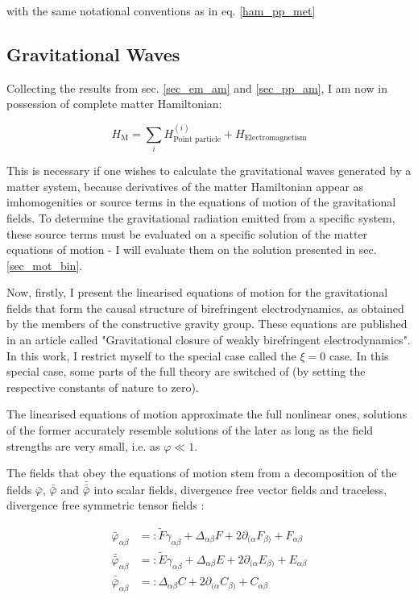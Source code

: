 \documentclass[11pt]{article}
\begin{document}
with the same notational conventions as in eq. \ref{ham_pp_met}

\subsection{Gravitational Waves}

Collecting the results from sec. \ref{sec_em_am} and \ref{sec_pp_am}, I am now in possession of complete matter Hamiltonian:

\begin{equation}
	H_{\text{M}}  = \sum_i H^{(i)}_{\text{Point particle}} + H_{\text{Electromagnetism}}
\end{equation}


 This is necessary if one wishes to calculate the gravitational waves generated by a matter system, because derivatives of the matter Hamiltonian appear as imhomogenities or source terms in the equations of motion of the gravitational fields. To determine the gravitational radiation emitted from a specific system, these source terms must be evaluated on a specific solution of the matter equations of motion - I will evaluate them on the solution presented in sec. \ref{sec_mot_bin}.

Now, firstly, I present the linearised equations of motion for the gravitational fields that form the causal structure of birefringent electrodynamics, as obtained by the members of the constructive gravity group. These equations are published in an article called "Gravitational closure of weakly birefringent electrodynamics". In this work, I restrict myself to the special case called the $\xi = 0$ case. In this special case, some parts of the full theory are switched of (by setting the respective constants of nature to zero).

The linearised equations of motion approximate the full nonlinear ones, solutions of the former accurately resemble solutions of the later as long as the field strengths are very small, i.e. as $\varphi \ll 1$.

The fields that obey the equations of motion stem from a decomposition of the fields $\bar{\varphi}$, $\bar{\bar{\varphi}}$ and $\bar{\bar{\bar{\varphi}}}$ into scalar fields, divergence free vector fields and traceless, divergence free  symmetric tensor fields :

\begin{align}
	\bar{\varphi}_{\alpha \beta} 
	&=: 
	\tilde{F} \gamma_{\alpha \beta} 
	+ \Delta_{\alpha \beta} F 
	+  2 \partial_{ ( \alpha} F_{\beta )} 
	+  F_{\alpha \beta} \label{def_F}  \\
	\bar{\bar{\varphi}}_{\alpha \beta} 
	&=:
	\tilde{E} \gamma_{\alpha \beta} 
	+ \Delta_{\alpha \beta} E 
	+  2 \partial_{ ( \alpha} E_{\beta )} 
	+  E_{\alpha \beta} \label{def_E} \\
	\bar{\bar{\varphi}}_{\alpha \beta} 
	&=: 
	\Delta_{\alpha \beta} C 
	+  2 \partial_{ ( \alpha} C_{\beta )} 
	+  C_{\alpha \beta} \label{def_C}
\end{align}
\end{document}
